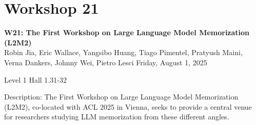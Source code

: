 \clearpage


\section[W21: The First Workshop on Large Language Model Memorization (L2M2)]{Workshop 21}
\label{workshop_21}

\begin{center}
    {\Large \textbf{W21: The First Workshop on Large Language Model Memorization (L2M2)}}\\
    

Robin Jia, Eric Wallace, Yangsibo Huang, Tiago Pimentel, Pratyush Maini, Verna Dankers, Johnny Wei, Pietro Lesci
    Friday, August 1, 2025

    Level 1 Hall 1.31-32
    
\end{center}

Description: The First Workshop on Large Language Model Memorization (L2M2), co-located with ACL 2025 in Vienna, seeks to provide a central venue for researchers studying LLM memorization from these different angles.


